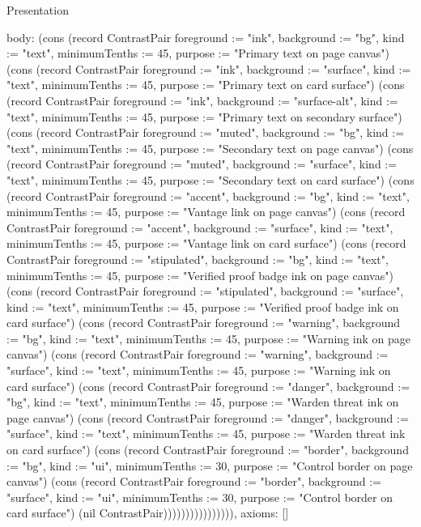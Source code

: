 \begin{lexlean}{Presentation}
\begin{semanticmodule}
{  body: (cons (record ContrastPair {foreground := "ink", background := "bg", kind := "text", minimumTenths := 45, purpose := "Primary text on page canvas"}) (cons (record ContrastPair {foreground := "ink", background := "surface", kind := "text", minimumTenths := 45, purpose := "Primary text on card surface"}) (cons (record ContrastPair {foreground := "ink", background := "surface-alt", kind := "text", minimumTenths := 45, purpose := "Primary text on secondary surface"}) (cons (record ContrastPair {foreground := "muted", background := "bg", kind := "text", minimumTenths := 45, purpose := "Secondary text on page canvas"}) (cons (record ContrastPair {foreground := "muted", background := "surface", kind := "text", minimumTenths := 45, purpose := "Secondary text on card surface"}) (cons (record ContrastPair {foreground := "accent", background := "bg", kind := "text", minimumTenths := 45, purpose := "Vantage link on page canvas"}) (cons (record ContrastPair {foreground := "accent", background := "surface", kind := "text", minimumTenths := 45, purpose := "Vantage link on card surface"}) (cons (record ContrastPair {foreground := "stipulated", background := "bg", kind := "text", minimumTenths := 45, purpose := "Verified proof badge ink on page canvas"}) (cons (record ContrastPair {foreground := "stipulated", background := "surface", kind := "text", minimumTenths := 45, purpose := "Verified proof badge ink on card surface"}) (cons (record ContrastPair {foreground := "warning", background := "bg", kind := "text", minimumTenths := 45, purpose := "Warning ink on page canvas"}) (cons (record ContrastPair {foreground := "warning", background := "surface", kind := "text", minimumTenths := 45, purpose := "Warning ink on card surface"}) (cons (record ContrastPair {foreground := "danger", background := "bg", kind := "text", minimumTenths := 45, purpose := "Warden threat ink on page canvas"}) (cons (record ContrastPair {foreground := "danger", background := "surface", kind := "text", minimumTenths := 45, purpose := "Warden threat ink on card surface"}) (cons (record ContrastPair {foreground := "border", background := "bg", kind := "ui", minimumTenths := 30, purpose := "Control border on page canvas"}) (cons (record ContrastPair {foreground := "border", background := "surface", kind := "ui", minimumTenths := 30, purpose := "Control border on card surface"}) (nil ContrastPair)))))))))))))))),
  axioms: []
}


\end{semanticmodule}
\end{lexlean}

